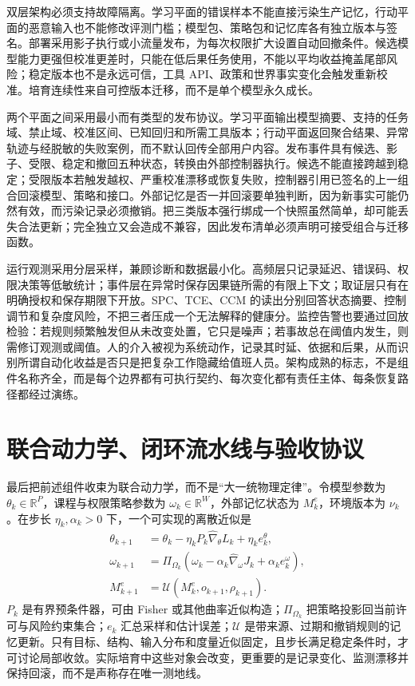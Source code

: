 双层架构必须支持故障隔离。学习平面的错误样本不能直接污染生产记忆，行动平面的恶意输入也不能修改评测门槛；模型包、策略包和记忆库各有独立版本与签名。部署采用影子执行或小流量发布，为每次权限扩大设置自动回撤条件。候选模型能力更强但校准更差时，只能在低后果任务使用，不能以平均收益掩盖尾部风险；稳定版本也不是永远可信，工具 API、政策和世界事实变化会触发重新校准。培育连续性来自可控版本迁移，而不是单个模型永久成长。

两个平面之间采用最小而有类型的发布协议。学习平面输出模型摘要、支持的任务域、禁止域、校准区间、已知回归和所需工具版本；行动平面返回聚合结果、异常轨迹与经脱敏的失败案例，而不默认回传全部用户内容。发布事件具有候选、影子、受限、稳定和撤回五种状态，转换由外部控制器执行。候选不能直接跨越到稳定；受限版本若触发越权、严重校准漂移或恢复失败，控制器引用已签名的上一组合回滚模型、策略和接口。外部记忆是否一并回滚要单独判断，因为新事实可能仍然有效，而污染记录必须撤销。把三类版本强行绑成一个快照虽然简单，却可能丢失合法更新；完全独立又会造成不兼容，因此发布清单必须声明可接受组合与迁移函数。

运行观测采用分层采样，兼顾诊断和数据最小化。高频层只记录延迟、错误码、权限决策等低敏统计；事件层在异常时保存因果链所需的有限上下文；取证层只有在明确授权和保存期限下开放。SPC、TCE、CCM 的读出分别回答状态摘要、控制调节和复杂度风险，不把三者压成一个无法解释的健康分。监控告警也要通过回放检验：若规则频繁触发但从未改变处置，它只是噪声；若事故总在阈值内发生，则需修订观测或阈值。人的介入被视为系统动作，记录其时延、依据和后果，从而识别所谓自动化收益是否只是把复杂工作隐藏给值班人员。架构成熟的标志，不是组件名称齐全，而是每个边界都有可执行契约、每次变化都有责任主体、每条恢复路径都经过演练。

\section{联合动力学、闭环流水线与验收协议}
\label{sec:grand_unification_agi_training}

最后把前述组件收束为联合动力学，而不是“大一统物理定律”。令模型参数为 $\theta_k\in\mathbb R^P$，课程与权限策略参数为 $\omega_k\in\mathbb R^W$，外部记忆状态为 $M^e_k$，环境版本为 $\nu_k$。在步长 $\eta_k,\alpha_k>0$ 下，一个可实现的离散近似是
\begin{align}
\theta_{k+1}&=\theta_k-\eta_kP_k\widehat\nabla_\theta L_k+\eta_ke_k^\theta,\\
\omega_{k+1}&=\Pi_{\Omega_k}\!\left(\omega_k-\alpha_k\widehat\nabla_\omega J_k+\alpha_ke_k^\omega\right),\\
M^e_{k+1}&=\mathcal U(M^e_k,o_{k+1},\rho_{k+1}).
\end{align}
$P_k$ 是有界预条件器，可由 Fisher 或其他曲率近似构造；$\Pi_{\Omega_k}$ 把策略投影回当前许可与风险约束集合；$e_k$ 汇总采样和估计误差；$\mathcal U$ 是带来源、过期和撤销规则的记忆更新。只有目标、结构、输入分布和度量近似固定，且步长满足稳定条件时，才可讨论局部收敛。实际培育中这些对象会改变，更重要的是记录变化、监测漂移并保持回滚，而不是声称存在唯一测地线。

